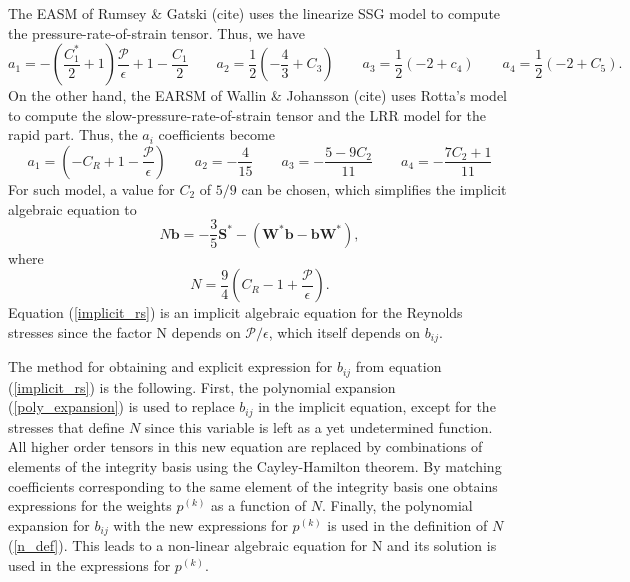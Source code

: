 \documentclass[oneside,a4paper,11pt]{report}
\newcommand{\Stau}{S^*}
\newcommand{\Wtau}{W^*}
\begin{document}
The EASM of Rumsey \& Gatski (cite) uses the linearize SSG model to compute the pressure-rate-of-strain tensor. Thus, we have
\begin{equation}
a_1 = - \left ( \frac{C_1^*}{2} + 1\right ) \frac{\mathcal{P}}{\epsilon} + 1 - \frac{C_1}{2} \qquad a_2 = \frac{1}{2} \left (-\frac{4}{3} + C_3 \right ) \qquad a_3 = \frac{1}{2} \left (-2 + c_4 \right ) \qquad a_4 = \frac{1}{2} \left (-2 + C_5 \right ).
\end{equation}
On the other hand, the EARSM of Wallin \& Johansson (cite) uses Rotta's model to compute the slow-pressure-rate-of-strain tensor and the LRR model for the rapid part.  Thus, the $a_i$ coefficients become
\begin{equation}
a_1 = \left ( -C_R + 1 - \frac{\mathcal{P}}{\epsilon} \right ) \qquad a_2 = -\frac{4}{15} \qquad a_3 = -\frac{5 - 9 C_2}{11} \qquad a_4 = -\frac{7C_2 + 1}{11}
\end{equation}
For such model, a value for $C_2$ of $5/9$ can be chosen, which simplifies the implicit algebraic equation to
\begin{equation}
\label{implicit_rs}
N \mathbf{b} = -\frac{3}{5} \mathbf{\Stau} - (\mathbf{\Wtau} \mathbf{b} - \mathbf{b} \mathbf{\Wtau}),
\end{equation}
where 
\begin{equation}
\label{n_def}
N = \frac{9}{4} \left ( C_R - 1 + \frac{\mathcal{P}}{\epsilon} \right ).
\end{equation}
Equation (\ref{implicit_rs}) is an implicit algebraic equation for the Reynolds stresses since the factor N depends on $\mathcal{P}/\epsilon$, which itself depends on $b_{ij}$. 

The method for obtaining and explicit expression for $b_{ij}$ from equation (\ref{implicit_rs}) is the following. First, the polynomial expansion (\ref{poly_expansion}) is used to replace $b_{ij}$ in the implicit equation, except for the stresses that define $N$ since this variable is left as a yet undetermined function. All higher order tensors in this new equation are replaced by combinations of elements of the integrity basis using the Cayley-Hamilton theorem. By matching coefficients corresponding to the same element of the integrity basis one obtains expressions for the weights $p^{(k)}$ as a function of $N$. Finally, the polynomial expansion for $b_{ij}$ with the new  expressions for $p^{(k)}$ is used in the definition of $N$ (\ref{n_def}). This leads to a non-linear algebraic equation for N and its solution is used in the expressions for $p^{(k)}$.
\end{document}
